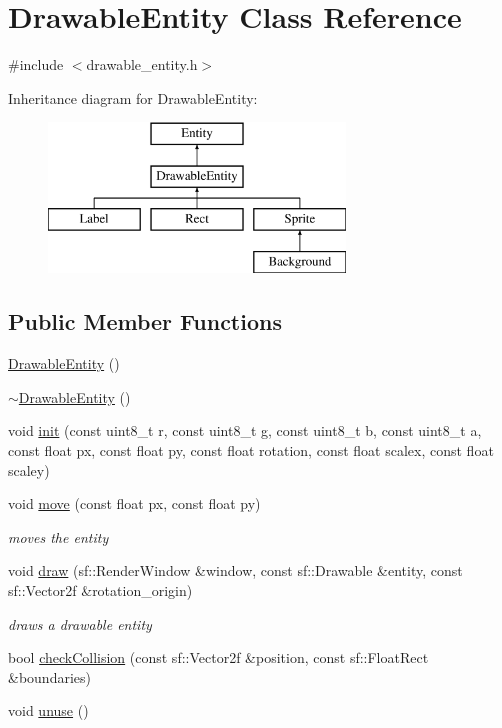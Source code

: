 \hypertarget{class_drawable_entity}{}\section{Drawable\+Entity Class Reference}
\label{class_drawable_entity}


{\ttfamily \#include $<$drawable\+\_\+entity.\+h$>$}

Inheritance diagram for Drawable\+Entity\+:\begin{figure}[H]
\begin{center}
\leavevmode
\includegraphics[height=4.000000cm]{class_drawable_entity}
\end{center}
\end{figure}
\subsection*{Public Member Functions}
\begin{DoxyCompactItemize}
\item 
\hyperlink{class_drawable_entity_a8e9f9afa7c76fdc19e27ca0975ffcb21}{Drawable\+Entity} ()
\item 
\hyperlink{class_drawable_entity_a8e70c62078d6a05b4cfc7b83c7b48859}{$\sim$\+Drawable\+Entity} ()
\item 
void \hyperlink{class_drawable_entity_a3893879bf0710a7f5c5e7eb758ad7e96}{init} (const uint8\+\_\+t r, const uint8\+\_\+t g, const uint8\+\_\+t b, const uint8\+\_\+t a, const float px, const float py, const float rotation, const float scalex, const float scaley)
\item 
void \hyperlink{class_drawable_entity_a016d3d0cc80f9834918de44e0adb19fb}{move} (const float px, const float py)
\begin{DoxyCompactList}\small\item\em moves the entity \end{DoxyCompactList}\item 
void \hyperlink{class_drawable_entity_a31ea3607cab83dc56103de086764369e}{draw} (sf\+::\+Render\+Window \&window, const sf\+::\+Drawable \&entity, const sf\+::\+Vector2f \&rotation\+\_\+origin)
\begin{DoxyCompactList}\small\item\em draws a drawable entity \end{DoxyCompactList}\item 
bool \hyperlink{class_drawable_entity_aa8c71a16b70006246b445b546b71a5b3}{check\+Collision} (const sf\+::\+Vector2f \&position, const sf\+::\+Float\+Rect \&boundaries)
\item 
void \hyperlink{class_drawable_entity_ab1f94327e78e0b3607ece6a66bf9f01c}{unuse} ()
\end{DoxyCompactItemize}

